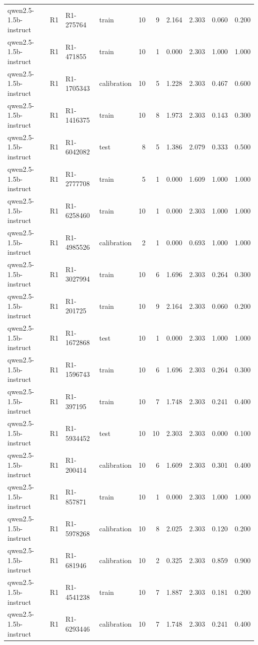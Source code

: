 \begin{table}
\begin{tabular}{llllrrrrrr}
qwen2.5-1.5b-instruct & R1 & R1-275764 & train & 10 & 9 & 2.164 & 2.303 & 0.060 & 0.200 \\
qwen2.5-1.5b-instruct & R1 & R1-471855 & train & 10 & 1 & 0.000 & 2.303 & 1.000 & 1.000 \\
qwen2.5-1.5b-instruct & R1 & R1-1705343 & calibration & 10 & 5 & 1.228 & 2.303 & 0.467 & 0.600 \\
qwen2.5-1.5b-instruct & R1 & R1-1416375 & train & 10 & 8 & 1.973 & 2.303 & 0.143 & 0.300 \\
qwen2.5-1.5b-instruct & R1 & R1-6042082 & test & 8 & 5 & 1.386 & 2.079 & 0.333 & 0.500 \\
qwen2.5-1.5b-instruct & R1 & R1-2777708 & train & 5 & 1 & 0.000 & 1.609 & 1.000 & 1.000 \\
qwen2.5-1.5b-instruct & R1 & R1-6258460 & train & 10 & 1 & 0.000 & 2.303 & 1.000 & 1.000 \\
qwen2.5-1.5b-instruct & R1 & R1-4985526 & calibration & 2 & 1 & 0.000 & 0.693 & 1.000 & 1.000 \\
qwen2.5-1.5b-instruct & R1 & R1-3027994 & train & 10 & 6 & 1.696 & 2.303 & 0.264 & 0.300 \\
qwen2.5-1.5b-instruct & R1 & R1-201725 & train & 10 & 9 & 2.164 & 2.303 & 0.060 & 0.200 \\
qwen2.5-1.5b-instruct & R1 & R1-1672868 & test & 10 & 1 & 0.000 & 2.303 & 1.000 & 1.000 \\
qwen2.5-1.5b-instruct & R1 & R1-1596743 & train & 10 & 6 & 1.696 & 2.303 & 0.264 & 0.300 \\
qwen2.5-1.5b-instruct & R1 & R1-397195 & train & 10 & 7 & 1.748 & 2.303 & 0.241 & 0.400 \\
qwen2.5-1.5b-instruct & R1 & R1-5934452 & test & 10 & 10 & 2.303 & 2.303 & 0.000 & 0.100 \\
qwen2.5-1.5b-instruct & R1 & R1-200414 & calibration & 10 & 6 & 1.609 & 2.303 & 0.301 & 0.400 \\
qwen2.5-1.5b-instruct & R1 & R1-857871 & train & 10 & 1 & 0.000 & 2.303 & 1.000 & 1.000 \\
qwen2.5-1.5b-instruct & R1 & R1-5978268 & calibration & 10 & 8 & 2.025 & 2.303 & 0.120 & 0.200 \\
qwen2.5-1.5b-instruct & R1 & R1-681946 & calibration & 10 & 2 & 0.325 & 2.303 & 0.859 & 0.900 \\
qwen2.5-1.5b-instruct & R1 & R1-4541238 & train & 10 & 7 & 1.887 & 2.303 & 0.181 & 0.200 \\
qwen2.5-1.5b-instruct & R1 & R1-6293446 & calibration & 10 & 7 & 1.748 & 2.303 & 0.241 & 0.400 \\

\end{tabular}
\end{table}
